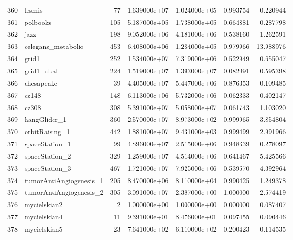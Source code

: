 \begin{tabular}{llrrrrr}
360 &                   lesmis &    77 &  1.639000e+07 &  1.024000e+05 &  0.993754 &   0.220944 \\
361 &                 polbooks &   105 &  5.187000e+05 &  1.738000e+05 &  0.664881 &   0.287798 \\
362 &                     jazz &   198 &  9.052000e+06 &  4.181000e+06 &  0.538160 &   1.262591 \\
363 &       celegans\_metabolic &   453 &  6.408000e+06 &  1.284000e+05 &  0.979966 &  13.988976 \\
364 &                    grid1 &   252 &  1.534000e+07 &  7.319000e+06 &  0.522949 &   0.655047 \\
365 &               grid1\_dual &   224 &  1.519000e+07 &  1.393000e+07 &  0.082991 &   0.595398 \\
366 &               chesapeake &    39 &  4.405000e+07 &  5.447000e+06 &  0.876353 &   0.109485 \\
367 &                    cz148 &   148 &  6.113000e+06 &  5.732000e+06 &  0.062333 &   0.402147 \\
368 &                    cz308 &   308 &  5.391000e+07 &  5.058000e+07 &  0.061743 &   1.103020 \\
369 &             hangGlider\_1 &   360 &  2.570000e+07 &  8.973000e+02 &  0.999965 &   3.854804 \\
370 &           orbitRaising\_1 &   442 &  1.881000e+07 &  9.431000e+03 &  0.999499 &   2.991966 \\
371 &           spaceStation\_1 &    99 &  4.896000e+07 &  2.515000e+06 &  0.948639 &   0.278097 \\
372 &           spaceStation\_2 &   329 &  1.259000e+07 &  4.514000e+06 &  0.641467 &   5.425566 \\
373 &           spaceStation\_3 &   467 &  1.721000e+07 &  7.925000e+06 &  0.539570 &   4.392964 \\
374 &  tumorAntiAngiogenesis\_1 &   205 &  8.470000e+06 &  8.110000e+04 &  0.990425 &   1.249378 \\
375 &  tumorAntiAngiogenesis\_2 &   305 &  3.091000e+07 &  2.387000e+00 &  1.000000 &   2.574419 \\
376 &             mycielskian2 &     2 &  1.000000e+00 &  1.000000e+00 &  0.000000 &   0.087407 \\
377 &             mycielskian4 &    11 &  9.391000e+01 &  8.476000e+01 &  0.097455 &   0.096446 \\
378 &             mycielskian5 &    23 &  7.641000e+02 &  6.110000e+02 &  0.200423 &   0.114535 \\

\end{tabular}
